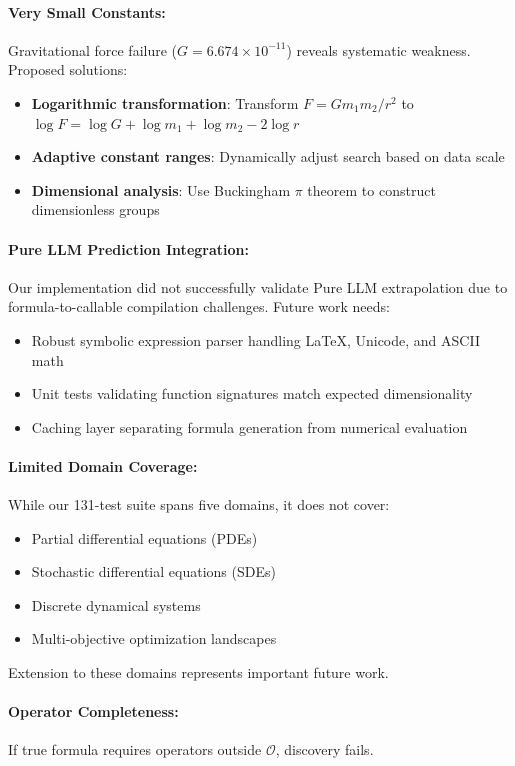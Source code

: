 \documentclass[twoside,11pt]{article}
\begin{document}
\paragraph{Very Small Constants:} Gravitational force failure ($G = 6.674 \times 10^{-11}$) reveals systematic weakness. Proposed solutions:
\begin{itemize}
\item \textbf{Logarithmic transformation}: Transform $F = Gm_1m_2/r^2$ to $\log F = \log G + \log m_1 + \log m_2 - 2\log r$
\item \textbf{Adaptive constant ranges}: Dynamically adjust search based on data scale
\item \textbf{Dimensional analysis}: Use Buckingham $\pi$ theorem to construct dimensionless groups
\end{itemize}

\paragraph{Pure LLM Prediction Integration:} Our implementation did not successfully validate Pure LLM extrapolation due to formula-to-callable compilation challenges. Future work needs:
\begin{itemize}
\item Robust symbolic expression parser handling LaTeX, Unicode, and ASCII math
\item Unit tests validating function signatures match expected dimensionality
\item Caching layer separating formula generation from numerical evaluation
\end{itemize}

\paragraph{Limited Domain Coverage:} While our 131-test suite spans five domains, it does not cover:
\begin{itemize}
\item Partial differential equations (PDEs)
\item Stochastic differential equations (SDEs)
\item Discrete dynamical systems
\item Multi-objective optimization landscapes
\end{itemize}

Extension to these domains represents important future work.

\paragraph{Operator Completeness:} If true formula requires operators outside $\mathcal{O}$, discovery fails.
\end{document}
